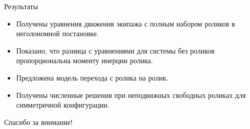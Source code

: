 \documentclass{beamer}
\begin{document}
\begin{frame}{Результаты}
  \begin{itemize}
  \item
    Получены уравнения движения экипажа \alert{с полным набором роликов} в неголономной постановке.
  \item
    Показано, что разница с уравнениями для системы без роликов пропорциональна моменту инерции ролика.
  \item Предложена модель перехода с ролика на ролик.
  \item
    Получены численные решения при неподвижных свободных роликах для симметричной конфигурации.
  \end{itemize}
  \vspace{10pt}
  \centering
  \textcolor{Periwinkle}{Спасибо за внимание!}
\end{frame}
\end{document}
